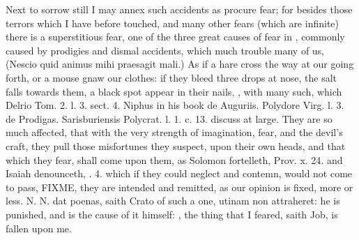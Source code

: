{Next to sorrow still I may annex such accidents as procure fear; for
besides those terrors which I have before touched, and many other
fears (which are infinite) there is a superstitious fear, one of the
three great causes of fear in \Aristotle, commonly caused by prodigies
and dismal accidents, which much trouble many of us, (Nescio quid
animus mihi praesagit mali.) As if a hare cross the way at our going
forth, or a mouse gnaw our clothes: if they bleed three drops at nose,
the salt falls towards them, a black spot appear in their nails, \etc{},
with many such, which Delrio Tom. 2. l. 3. sect. 4. \Austin{} Niphus in
his book de Auguriis. Polydore Virg. l. 3. de Prodigas. Sarisburiensis
Polycrat. l. 1. c. 13. discuss at large. They are so much affected,
that with the very strength of imagination, fear, and the devil's
craft, they pull those misfortunes they suspect, upon their own
heads, and that which they fear, shall come upon them, as Solomon
fortelleth, Prov. x. 24. and Isaiah denounceth, . 4. which if
they could neglect and contemn, would not come to pass, FIXME, they are intended and remitted, as our opinion is fixed,
more or less. N. N. dat poenas, saith Crato of such a one, utinam
non attraheret: he is punished, and is the cause of it  himself:
, the thing that I feared,
saith Job, is fallen upon me.

}
